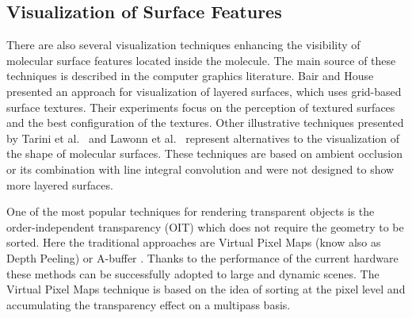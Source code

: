\subsection{Visualization of Surface Features}
There are also several visualization techniques enhancing the visibility of molecular surface features located inside the molecule. The main source of these techniques is described in the computer graphics literature. Bair and House~\cite{Bair2007} presented an approach for visualization of layered surfaces, which uses grid-based surface textures. Their experiments focus on the perception of textured surfaces and the best configuration of the textures. 
Other illustrative techniques presented by Tarini et al.~\cite{Tarini2006} and Lawonn et al.~\cite{Lawonn2014} represent alternatives to the visualization of the shape of molecular surfaces. 
These techniques are based on ambient occlusion or its combination with line integral convolution and were not designed to show more layered surfaces.

One of the most popular techniques for rendering transparent objects is the order-independent transparency (OIT) which does not require the geometry to be sorted.
Here the traditional approaches are Virtual Pixel Maps (know also as Depth Peeling) \cite{mammen1989transparency} or A-buffer \cite{carpenter1984abuffer}.
Thanks to the performance of the current hardware these methods can be successfully adopted to large and dynamic scenes.
The Virtual Pixel Maps technique is based on the idea of sorting at the pixel level and accumulating the transparency effect on a multipass basis. 

